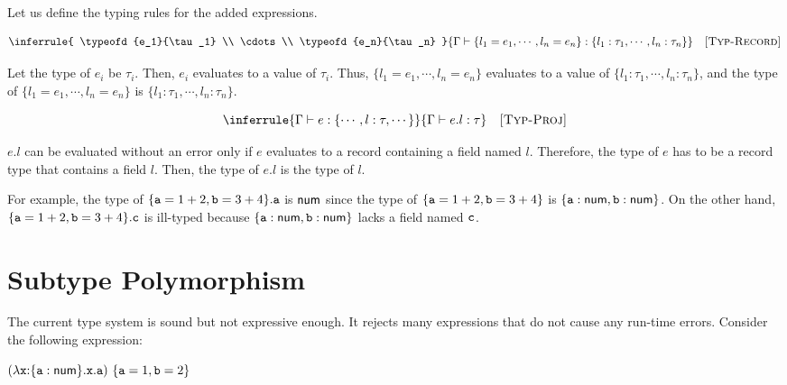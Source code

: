 Let us define the typing rules for the added expressions.


\vspace{-1em}

\[
  \inferrule
  { \typeofd{e_1}{\tau_1} \\ \cdots \\
    \typeofd{e_n}{\tau_n} }
  { \typeofd{\{l_1=e_1,\cdots,l_n=e_n\}}{\{l_1:\tau_1,\cdots,l_n:\tau_n\}} }
  \quad\textsc{[Typ-Record]}
\]

Let the type of $e_i$ be $\tau_i$. Then, $e_i$ evaluates to a value of $\tau_i$.
Thus, $\{l_1=e_1,\cdots,l_n=e_n\}$ evaluates to a value of
$\{l_1:\tau_1,\cdots,l_n:\tau_n\}$, and the type of
$\{l_1=e_1,\cdots,l_n=e_n\}$ is  $\{l_1:\tau_1,\cdots,l_n:\tau_n\}$.


\vspace{-1em}

\[
  \inferrule
  { \typeofd{e}{\{\cdots,l:\tau,\cdots\}} }
  { \typeofd{e.l}{\tau} }
  \quad\textsc{[Typ-Proj]}
\]

$e.l$ can be evaluated without an error only if $e$
evaluates to a record containing a field named $l$. Therefore, the type
of $e$ has to be a record type that contains a field $l$. Then, the type of
$e.l$ is the type of $l$.

For example, the type of $\{\texttt{a}=1+2,\texttt{b}=3+4\}.\texttt{a}$ is $\textsf{num}$ since
the type of $\{\texttt{a}=1+2,\texttt{b}=3+4\}$ is $\{\texttt{a}:\textsf{num},\texttt{b}:\textsf{num}\}$.
On the other hand, $\{\texttt{a}=1+2,\texttt{b}=3+4\}.\texttt{c}$ is ill-typed because
$\{\texttt{a}:\textsf{num},\texttt{b}:\textsf{num}\}$ lacks a field named $\texttt{c}$.

\section{Subtype Polymorphism}

The current type system is sound but not expressive enough. It rejects many
expressions that do not cause any run-time errors. Consider the following
expression:

$
  (\efunt{\cx}{\{\ca:\tnum\}}{\cx.\ca})\ \{\ca=1,\cb=2\}
$

